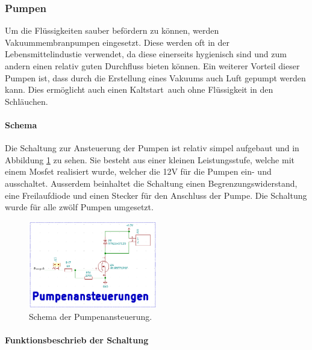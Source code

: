 \subsubsection{Pumpen}
\label{subsubsec:Pumpen}

Um die Flüssigkeiten sauber befördern zu können, werden Vakuummembranpumpen eingesetzt. Diese werden oft in der Lebensmittelindustie verwendet, da diese einerseits hygienisch sind und zum andern einen relativ guten Durchfluss bieten können. Ein weiterer Vorteil dieser Pumpen ist, dass durch die Erstellung eines Vakuums auch Luft gepumpt werden kann. Dies ermöglicht auch einen \flqq Kaltstart\frqq\ auch ohne Flüssigkeit in den Schläuchen.

\paragraph{Schema}\mbox{}

Die Schaltung zur Ansteuerung der Pumpen ist relativ simpel aufgebaut und in Abbildung \ref{fig:Schema_Pumpenansteuerung} zu sehen. Sie besteht aus einer kleinen Leistungsstufe, welche mit einem Mosfet realisiert wurde, welcher die 12V für die Pumpen  ein- und ausschaltet. Ausserdem beinhaltet die Schaltung einen Begrenzungswiderstand, eine Freilaufdiode und einen Stecker für den Anschluss der Pumpe. Die Schaltung wurde für alle zwölf Pumpen umgesetzt.

\begin{figure}[h!]
	\centering
	\includegraphics[width=0.5\textwidth]{graphics/Schema_Pumpenansteuerung.png}
	\caption{Schema der Pumpenansteuerung.}
	\label{fig:Schema_Pumpenansteuerung}
\end{figure}

\paragraph{Funktionsbeschrieb der Schaltung}\mbox{}

